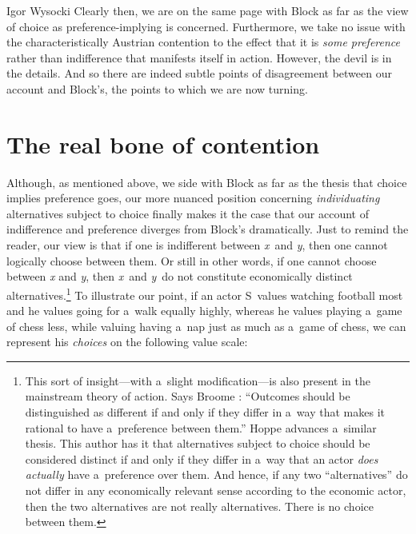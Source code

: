 \begin{artengenv}{Igor Wysocki}
Clearly then, we are on the same page with Block as far as the view of choice as preference-implying is concerned. Furthermore, we take no issue with the characteristically Austrian contention to the effect that it is \textit{some preference} rather than indifference that manifests itself in action. However, the devil is in the details. And so there are indeed subtle points of disagreement between our account and Block's, the points to which we are now turning.



\section{The real bone of contention}

Although, as mentioned above, we side with Block as far as the thesis that choice implies preference goes, our more nuanced position concerning \textit{individuating} alternatives subject to choice finally makes it the case that our account of indifference and preference diverges from Block's dramatically. Just to remind the reader, our view is that if one is indifferent between \textit{x}~and \textit{y}, then one cannot logically choose between them. Or still in other words, if one cannot choose between \textit{x} and \textit{y}, then \textit{x}~and \textit{y}~do not constitute economically distinct alternatives.\footnote{This sort of insight---with a~slight modification---is also present in the mainstream theory of action. Says Broome 
\parencite*[][p.103]{broome_weighing_1991}: %
 ``Outcomes should be distinguished as different if and only if they differ in a~way that makes it rational to have a~preference between them.'' Hoppe 
\parencite*[][]{hoppe_must_2005} %
 advances a~similar thesis. This author has it that alternatives subject to choice should be considered distinct if and only if they differ in a~way that an actor \textit{does actually} have a~preference over them. And hence, if any two ``alternatives'' do not differ in any economically relevant sense according to the economic actor, then the two alternatives are not really alternatives. There is no choice between them. } To illustrate our point, if an actor S~values watching football most and he values going for a~walk equally highly, whereas he values playing a~game of chess less, while valuing having a~nap just as much as a~game of chess, we can represent his \textit{choices} on the following value scale:








\end{artengenv}
